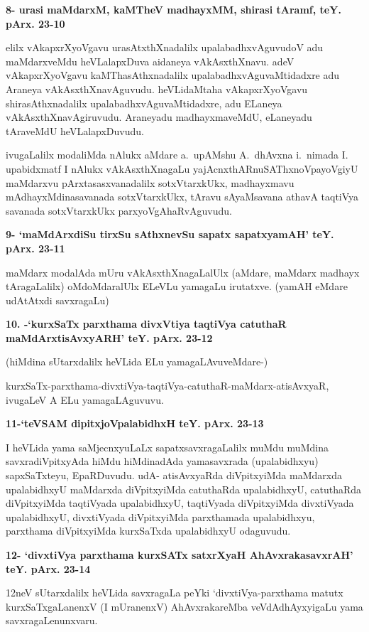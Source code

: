 \medskip
\noindent
\textbf{8- urasi maMdarxM, kaMTheV madhayxMM, shirasi tAramf, teY. pArx. 23-10}

\smallskip
elilx vAkapxrXyoVgavu urasAtxthXnadalilx upalabadhxvAguvudoV adu maMdarx\-veMdu heVLalapxDuva aida\-neya vAkAsxthXnavu. adeV vAkapxrXyoVgavu kaMThasAthxnadalilx upalabadhxvAguvaMtidadxre adu Araneya vAkAsxthX\-na\-vAguvudu. heVLidaMtaha vAkapxrXyoVgavu shirasAthxnadalilx upalabadhxvAguvaMtidadxre, adu ELaneya vAkAsxthXna\-vAgiruvudu. Araneyadu madhayxmaveMdU, eLaneyadu tAraveMdU heVLalapxDuvudu.

ivugaLalilx modaliMda nAlukx aMdare a.~upAMshu A.~dhAvxna i.~\hbox{nimada} I. upabidxmatf I nAlukx vAkAsxthXnagaLu yajAcnxthARnuSAThxnoVpayoVgiyU maMdarxvu pArxtasasxvanadalilx sotxVtarxkUkx, madhayx\-mavu mAdhayxMdinasavanada sotxVtarxkUkx, tAravu sAyaMsavana athavA taqtiVya savanada sotxVtarxkUkx parxyoV\-gAhaRvAgu\-vudu.

\medskip
\noindent
\textbf{9- `maMdArxdiSu tirxSu sAthxnevSu sapatx sapatxyamAH' teY. pArx. 23-11}

\smallskip
maMdarx modalAda mUru vAkAsxthXnagaLalUlx (aMdare, maMdarx madhayx tAragaLalilx) oMdoMdaralUlx ELeVLu yamagaLu irutatxve. (yamAH eMdare udAtAtxdi savxragaLu)


\medskip
\noindent
\textbf{10. -`kurxSaTx parxthama divxVtiya taqtiVya catuthaR maMdArxtisAvxyARH' teY. pArx. 23-12}

\smallskip
(hiMdina sUtarxdalilx heVLida ELu yamagaLAvuveMdare-)

kurxSaTx-parxthama-divxtiVya-taqtiVya-catuthaR-maMdarx-atisAvxyaR, ivugaLeV A ELu yamagaLAgu\-vuvu.

\eject

\noindent
\textbf{11-`teVSAM dipitxjoVpalabidhxH teY. pArx. 23-13}

\smallskip
I heVLida yama saMjecnxyuLaLx sapatxsavxragaLalilx muMdu muMdina savxradiVpitx\-yAda hiMdu hiMdina\-dAda yamasavxrada (upalabidhxyu) sapxSaTxteyu, EpaRDu\-vudu. udA- atisAvxyaRda diVpitx\-yiMda maMdarxda upalabidhxyU maMdarxda diVpitxyiMda catuthaRda upalabidhxyU, catuthaRda diVpitxyiMda taqtiV\-yada upalabidhxyU, taqtiVyada diVpitxyiMda divxtiVyada upalabidhxyU, divxtiVyada diVpitx\-yiMda parxtha\-mada upalabidhxyu, parxthama diVpitxyiMda kurxSaTxda upalabidhxyU odaguvudu.

\medskip
\noindent
\textbf{12- `divxtiVya parxthama kurxSATx satxrXyaH AhAvxrakasavxrAH' teY. pArx. 23-14}

\smallskip
12neV sUtarxdalilx heVLida savxragaLa peYki `divxtiVya-parxthama matutx kurxSaTxgaLanenxV (I mUranenxV) AhAvxraka\-reMba veVdAdhAyxyigaLu yama savxragaLenunxvaru.

